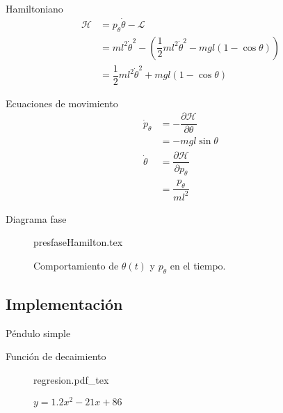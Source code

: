 \documentclass{beamer}
\begin{document}
\begin{frame}{Hamiltoniano}
\begin{equation}
 \begin{split}
  \mathcal H & = p_{\theta} \dot \theta - \mathcal L \\
  & = m l^2 \dot \theta ^2 - (\dfrac{1}{2}m l^2 \dot{\theta}^2 - m g l (1 - \cos{\theta}))\\
  & = \dfrac{1}{2}m l^2 \dot{\theta}^2 + m g l (1 - \cos{\theta})
 \end{split}
 \label{eq: hamiltonian pendulum}
\end{equation}
\end{frame}

\begin{frame}{Ecuaciones de movimiento}
    \begin{subequations}
 \begin{align}
  \dot p_{\theta} &= - \dfrac{\partial \mathcal H}{\partial \theta}\\
  &= -mgl \sin \theta \\
  \dot \theta &= \dfrac{\partial \mathcal H}{\partial p_{\theta}}\\
  &= \dfrac{p_{\theta}}{ml^2}
 \end{align}
\end{subequations}
\end{frame}


\begin{frame}{Diagrama fase}
 \begin{figure}[htb!]
 \centering 
 {presfaseHamilton.tex}
 \caption{Comportamiento de $\theta(t)$ y $p_{\theta}$ en el tiempo.}
 \label{fig: phase plot theta ptheta hamiltonian}
\end{figure}
\end{frame}


\subsection{Implementación}
\begin{frame}{Péndulo simple}
 
\end{frame}



\begin{frame}{Función de decaimiento}
 \begin{figure}[htb!]
 \centering
{regresion.pdf_tex}
 \caption{$y = 1.2 x^2 - 21 x + 86$}
 \label{fig: regresion}
\end{figure}
\end{frame}
\end{document}
